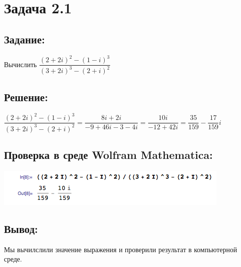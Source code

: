 \section{Задача 2.1}
\subsection{Задание:}
Вычислить
$
	\dfrac{(2 + 2i)^2 - (1 - i)^3}{(3 + 2i)^3 - (2 + i)^2}
$
\subsection{Решение:}
$
	\dfrac{(2 + 2i)^2 - (1 - i)^3}{(3 + 2i)^3 - (2 + i)^2}
	=
	\dfrac{8i + 2i}{-9 + 46i - 3 - 4i}
	=
	\dfrac{10i}{-12 + 42i}
	=
	\dfrac{35}{159} - \dfrac{17}{159} i
$
\subsection{Проверка в среде Wolfram Mathematica:}
\includegraphics[scale=0.6]{task/2_01/screen1.png}
\subsection{Вывод:}
Мы вычилслили значение выражения и проверили результат в компьютерной среде.
